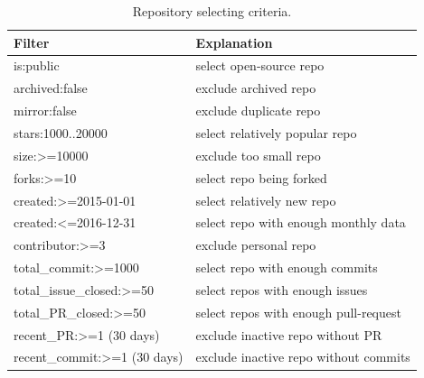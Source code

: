 \documentclass[smallextended]{svjour3}
\begin{document}
\begin{table} 
\centering
\caption{Repository selecting criteria.}
\label{tbl:select}
\begin{adjustbox}{max width=0.98\textwidth}
\begin{tabular}{l|l}
\rowcolor[HTML]{BDBDBD} 
{\color[HTML]{000000} Filter} & {\color[HTML]{000000} Explanation} \\ \hline
\rowcolor[HTML]{FFFFFF} 
{\color[HTML]{000000} is:public} & {\color[HTML]{000000} select open-source repo} \\
\rowcolor[HTML]{F3F3F3} 
{\color[HTML]{000000} archived:false} & {\color[HTML]{000000} exclude archived repo} \\
\rowcolor[HTML]{FFFFFF} 
{\color[HTML]{000000} mirror:false} & {\color[HTML]{000000} exclude duplicate repo} \\
\rowcolor[HTML]{F3F3F3} 
{\color[HTML]{000000} stars:1000..20000} & {\color[HTML]{000000} select relatively popular repo} \\
\rowcolor[HTML]{FFFFFF} 
{\color[HTML]{000000} size:\textgreater{}=10000} & {\color[HTML]{000000} exclude too small repo} \\
\rowcolor[HTML]{F3F3F3} 
{\color[HTML]{000000} forks:\textgreater{}=10} & {\color[HTML]{000000} select repo being forked} \\
\rowcolor[HTML]{FFFFFF} 
{\color[HTML]{000000} created:\textgreater{}=2015-01-01} & {\color[HTML]{000000} select relatively new repo} \\
\rowcolor[HTML]{F3F3F3} 
{\color[HTML]{000000} created:\textless{}=2016-12-31} & {\color[HTML]{000000} select repo with enough monthly data} \\
\rowcolor[HTML]{FFFFFF} 
{\color[HTML]{000000} contributor:\textgreater{}=3} & {\color[HTML]{000000} exclude personal repo} \\
\rowcolor[HTML]{F3F3F3} 
{\color[HTML]{000000} total\_commit:\textgreater{}=1000} & {\color[HTML]{000000} select repo with enough commits} \\
\rowcolor[HTML]{FFFFFF} 
{\color[HTML]{000000} total\_issue\_closed:\textgreater{}=50} & {\color[HTML]{000000} select repos with enough issues} \\
\rowcolor[HTML]{F3F3F3} 
{\color[HTML]{000000} total\_PR\_closed:\textgreater{}=50} & {\color[HTML]{000000} select repos with enough pull-request} \\
\rowcolor[HTML]{FFFFFF} 
{\color[HTML]{000000} recent\_PR:\textgreater{}=1 (30 days)} & {\color[HTML]{000000} exclude inactive repo without PR} \\
\rowcolor[HTML]{F3F3F3} 
{\color[HTML]{000000} recent\_commit:\textgreater{}=1 (30 days)} & {\color[HTML]{000000} exclude inactive repo without commits}
\end{tabular}
\end{adjustbox}
\end{table}
\end{document}
